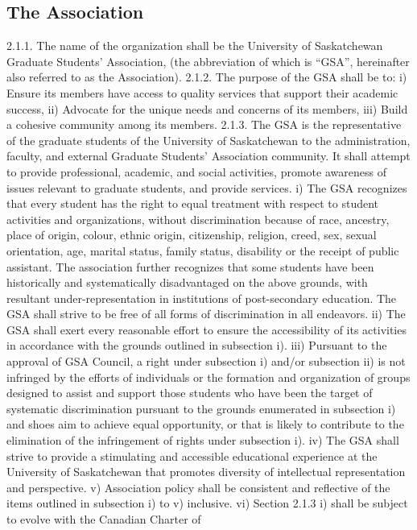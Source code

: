 \documentclass{article}
\begin{document}
\subsection{ The Association }
2.1.1. The name of the organization shall be the University of Saskatchewan Graduate Students’ Association, (the abbreviation of which is “GSA”, hereinafter also referred to as the Association). 
2.1.2. The purpose of the GSA shall be to: 
i) Ensure its members have access to quality services that support their academic success, 
ii) Advocate for the unique needs and concerns of its members, 
iii) Build a cohesive community among its members. 
2.1.3. The GSA is the representative of the graduate students of the University of Saskatchewan to the administration, faculty, and external Graduate Students’ Association community. It shall attempt to provide professional, academic, and social activities, promote awareness of issues relevant to graduate students, and provide services. 
i) The GSA recognizes that every student has the right to equal treatment with respect to student activities and organizations, without discrimination because of race, ancestry, place of origin, colour, ethnic origin, citizenship, religion, creed, sex, sexual orientation, age, marital status, family status, disability or the receipt of public assistant. The association further recognizes that some students have been historically and systematically disadvantaged on the above grounds, with resultant under-representation in institutions of post-secondary 
education. The GSA shall strive to be free of all forms of discrimination in all endeavors. 
ii) The GSA shall exert every reasonable effort to ensure the accessibility 
of its activities in accordance with the grounds outlined in subsection 
i). 
iii) Pursuant to the approval of GSA Council, a right under subsection i) 
and/or subsection ii) is not infringed by the efforts of individuals or the 
formation and organization of groups designed to assist and support 
those students who have been the target of systematic discrimination 
pursuant to the grounds enumerated in subsection i) and shoes aim to 
achieve equal opportunity, or that is likely to contribute to the 
elimination of the infringement of rights under subsection i). 
iv) The GSA shall strive to provide a stimulating and accessible 
educational experience at the University of Saskatchewan that 
promotes diversity of intellectual representation and perspective. 
v) Association policy shall be consistent and reflective of the items 
outlined in subsection i) to v) inclusive. 
vi) Section 2.1.3 i) shall be subject to evolve with the Canadian Charter of 
\end{document}
